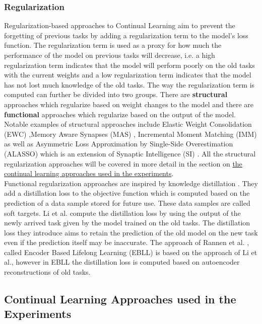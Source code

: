 \subsubsection{Regularization}
Regularization-based approaches to Continual Learning aim to prevent the forgetting of previous tasks by adding a regularization
term to the model's loss function. The regularization term is used as a proxy for how much the performance of the model on previous
tasks will decrease, i.e. a high regularization term indicates that the model will perform poorly on the old tasks with the current
weights and a low regularization term indicates that the model has not lost much knowledge of the old tasks. The way the
regularization term is computed can further be divided into two groups. There are \textbf{structural} approaches which regularize
based on weight changes to the model and there are \textbf{functional} approaches which regularize based on the output of the model.
Notable examples of structural approaches include Elastic Weight Consolidation (EWC) \cite{kirkpatrick2017overcoming},Memory Aware
Synapses (MAS) \cite{aljundi2018memory}, Incremental Moment Matching (IMM) \cite{lee2017overcoming} as well as Asymmetric Loss
Approximation by Single-Side Overestimation (ALASSO) \cite{park2019continual} which is an extension of Synaptic Intelligence (SI)
\cite{zenke2017continual}. All the structural regularization approaches will be covered in more detail in the section on
\hyperref[sec:Related_work:Continual_Learning:Experiments]{the continual learning approaches used in the experiments}. \\
Functional regularization approaches are inspired by knowledge distillation \cite{hinton2015distilling}. They add a distillation
loss to the objective function which is computed based on the prediction of a data sample stored for future use. These data samples
are called soft targets. Li et al. \cite{li2017learning} compute the distillation loss by using the output of the newly arrived task
given by the model trained on the old tasks. The distillation loss they introduce aims to retain the prediction of the old model on
the new task even if the prediction itself may be inaccurate. The approach of Rannen et al.
\cite{rannen2017encoder}, called Encoder Based Lifelong Learning (EBLL) is based on the approach of Li et al., however in EBLL the
distillation loss is computed based on autoencoder reconstructions of old tasks.
\subsection{Continual Learning Approaches used in the Experiments}
\label{sec:Related_work:Continual_Learning:Experiments}
